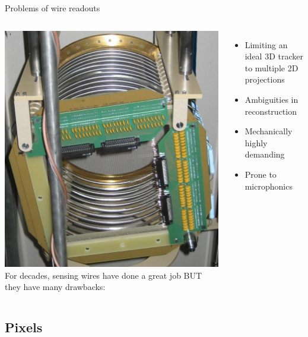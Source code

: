 \documentclass[]{beamer}
\newcommand*{\emphcol}{red}
\begin{document}
\begin{frame}{Problems of wire readouts}
	\begin{columns}[c]
		\centering
		\includegraphics[width=\textwidth]{defence/mat_wires}
		For decades, sensing wires have done a great job
		BUT they have many drawbacks:
		\begin{itemize}
			\item {\color{\emphcol} Limiting an ideal 3D tracker to multiple 2D projections}
			\item Ambiguities in reconstruction
			\item Mechanically highly demanding
			\item Prone to microphonics
		\end{itemize}
	\end{columns}
\end{frame}

\subsection{Pixels}
\end{document}

